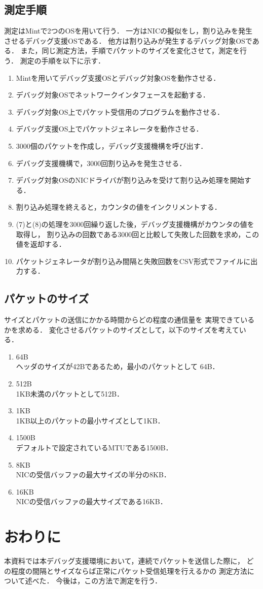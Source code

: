 \documentclass[12pt]{jsarticle}
\begin{document}
\subsection{測定手順}
測定はMintで2つのOSを用いて行う．
一方はNICの擬似をし，割り込みを発生させるデバッグ支援OSである．
他方は割り込みが発生するデバッグ対象OSである．
また，同じ測定方法，手順でパケットのサイズを変化させて，測定を行う．
測定の手順を以下に示す．

\begin{enumerate}
    \item Mintを用いてデバッグ支援OSとデバッグ対象OSを動作させる．
    \item デバッグ対象OSでネットワークインタフェースを起動する．
    \item デバッグ対象OS上でパケット受信用のプログラムを動作させる．
    \item デバッグ支援OS上でパケットジェネレータを動作させる．
    \item 3000個のパケットを作成し，デバッグ支援機構を呼び出す．
    \item デバッグ支援機構で，3000回割り込みを発生させる．
    \item デバッグ対象OSのNICドライバが割り込みを受けて割り込み処理を開始する．
    \item 割り込み処理を終えると，カウンタの値をインクリメントする．
    \item (7)と(8)の処理を3000回繰り返した後，デバッグ支援機構がカウンタの値を取得し，
        割り込みの回数である3000回と比較して失敗した回数を求め，この値を返却する．
    \item パケットジェネレータが割り込み間隔と失敗回数をCSV形式でファイルに出力する．
\end{enumerate}



\subsection{パケットのサイズ}
サイズとパケットの送信にかかる時間からどの程度の通信量を
実現できているかを求める．
変化させるパケットのサイズとして，以下のサイズを考えている．
\begin{enumerate}
    \item 64B\\
        ヘッダのサイズが42Bであるため，最小のパケットとして
        64B．
    \item 512B\\
        1KB未満のパケットとして512B．
    \item 1KB\\
        1KB以上のパケットの最小サイズとして1KB．
    \item 1500B\\
        デフォルトで設定されているMTUである1500B．
    \item 8KB\\
        NICの受信バッファの最大サイズの半分の8KB．
    \item 16KB\\
        NICの受信バッファの最大サイズである16KB．
\end{enumerate}

\section{おわりに}
本資料では本デバッグ支援環境において，連続でパケットを送信した際に，
どの程度の間隔とサイズならば正常にパケット受信処理を行えるかの
測定方法について述べた．
今後は，この方法で測定を行う．
\end{document}

